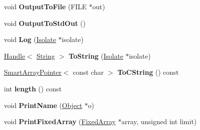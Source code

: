 \begin{DoxyCompactItemize}
\item 
\hypertarget{classv8_1_1internal_1_1_v8___f_i_n_a_l_a2a37237aac7ec5351c8c675bd5d94c3f}{}void {\bfseries Output\+To\+File} (F\+I\+L\+E $\ast$out)\label{classv8_1_1internal_1_1_v8___f_i_n_a_l_a2a37237aac7ec5351c8c675bd5d94c3f}

\item 
\hypertarget{classv8_1_1internal_1_1_v8___f_i_n_a_l_accf116020259d63919424c1e8705d52b}{}void {\bfseries Output\+To\+Std\+Out} ()\label{classv8_1_1internal_1_1_v8___f_i_n_a_l_accf116020259d63919424c1e8705d52b}

\item 
\hypertarget{classv8_1_1internal_1_1_v8___f_i_n_a_l_aa301cb3f5930c386f1eaf1e8221cc970}{}void {\bfseries Log} (\hyperlink{classv8_1_1internal_1_1_isolate}{Isolate} $\ast$isolate)\label{classv8_1_1internal_1_1_v8___f_i_n_a_l_aa301cb3f5930c386f1eaf1e8221cc970}

\item 
\hypertarget{classv8_1_1internal_1_1_v8___f_i_n_a_l_af80c3191a3095b2d548f9c47eb04cafc}{}\hyperlink{classv8_1_1internal_1_1_handle}{Handle}$<$ \hyperlink{classv8_1_1internal_1_1_string}{String} $>$ {\bfseries To\+String} (\hyperlink{classv8_1_1internal_1_1_isolate}{Isolate} $\ast$isolate)\label{classv8_1_1internal_1_1_v8___f_i_n_a_l_af80c3191a3095b2d548f9c47eb04cafc}

\item 
\hypertarget{classv8_1_1internal_1_1_v8___f_i_n_a_l_a862d2fa45739931611828e08ea9e92a2}{}\hyperlink{classv8_1_1internal_1_1_smart_array_pointer}{Smart\+Array\+Pointer}$<$ const char $>$ {\bfseries To\+C\+String} () const \label{classv8_1_1internal_1_1_v8___f_i_n_a_l_a862d2fa45739931611828e08ea9e92a2}

\item 
\hypertarget{classv8_1_1internal_1_1_v8___f_i_n_a_l_a60979317d806209562eb02b81421b9fd}{}int {\bfseries length} () const \label{classv8_1_1internal_1_1_v8___f_i_n_a_l_a60979317d806209562eb02b81421b9fd}

\item 
\hypertarget{classv8_1_1internal_1_1_v8___f_i_n_a_l_a224f27b50d9477f1080761c3d29a55d8}{}void {\bfseries Print\+Name} (\hyperlink{classv8_1_1internal_1_1_object}{Object} $\ast$o)\label{classv8_1_1internal_1_1_v8___f_i_n_a_l_a224f27b50d9477f1080761c3d29a55d8}

\item 
\hypertarget{classv8_1_1internal_1_1_v8___f_i_n_a_l_a6de6dd86544b8da5517221980e9b48ba}{}void {\bfseries Print\+Fixed\+Array} (\hyperlink{classv8_1_1internal_1_1_fixed_array}{Fixed\+Array} $\ast$array, unsigned int limit)\label{classv8_1_1internal_1_1_v8___f_i_n_a_l_a6de6dd86544b8da5517221980e9b48ba}


\end{DoxyCompactItemize}
